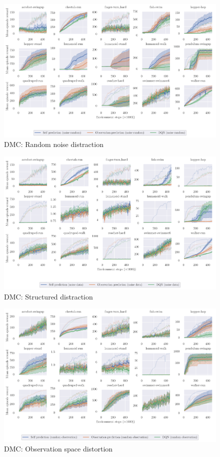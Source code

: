 \begin{figure}
    \centering
    \includegraphics[width=\textwidth]{figures/understanding/rlc2024-random-noise_mujoco.pdf}
    \caption{DMC: Random noise distraction}
    \label{fig:muj_ran_noi}
\end{figure}

\begin{figure}
    \centering
    \includegraphics[width=\textwidth]{figures/understanding/rlc2024-random-data_mujoco.pdf}
    \caption{DMC: Structured distraction}
    \label{fig:muj_ran_str}
\end{figure}

\begin{figure}
    \centering
    \includegraphics[width=\textwidth]{figures/understanding/rlc2024-distorted-fixed_mujoco.pdf}
    \caption{DMC: Observation space distortion}
    \label{fig:muj_dis}
\end{figure}


